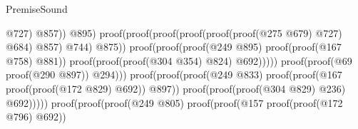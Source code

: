 \begin{lexlean}{PremiseSound}
\begin{coremodule}
                                                                                      @727)
                                                                                    @857))
                                                                              @895)
                                                                            proof(proof(proof(proof(proof(proof(@275
                                                                                          @679)
                                                                                        @727)
                                                                                      @684)
                                                                                    @857)
                                                                                  @744)
                                                                                @875))
                                                                          proof(proof(proof(@249
                                                                                  @895)
                                                                                proof(proof(@167
                                                                                      @758)
                                                                                    @881))
                                                                              proof(proof(proof(@304
                                                                                      @354)
                                                                                    @824)
                                                                                  @692)))))
                                                                proof(proof(@69 proof(@290 @897))
                                                                    @294)))
                                                          proof(proof(proof(@249 @833)
                                                                proof(proof(@167
                                                                      proof(proof(@172 @829) @692))
                                                                    @897))
                                                              proof(proof(proof(@304 @829) @236)
                                                                  @692)))))
                                                proof(proof(proof(@249 @805)
                                                      proof(proof(@157 proof(proof(@172 @796) @692))

\end{coremodule}
\end{lexlean}
